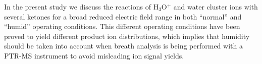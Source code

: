 
In the present study we discuss the reactions of H$_3$O$^+$ and water cluster ions with several ketones for a broad reduced electric field range   in both “normal” and “humid” operating conditions. This different operating conditions have been proved to yield different product ion distributions, which implies that humidity should be taken into account when breath analysis is being performed with a PTR-MS instrument to avoid misleading ion signal yields. 


